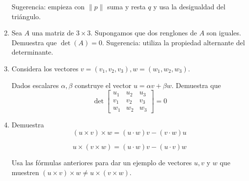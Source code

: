 \documentclass{article}
\theoremstyle{definition}
\begin{document}
\begin{enumerate}
                Sugerencia: empieza con $\|p\|$ suma  y resta $q$ y usa la desigualdad del tri\'angulo.	

\item\label{Ejer:DeterRenglonesRepetidos} Sea $A$ una matriz de $3 \times 3$. Supongamos que dos renglones de $A$ son iguales. Demuestra
que $\det(A)=0$. Sugerencia: utiliza la propiedad alternante del determinante.

\item Considera los vectores $v=(v_1,v_2,v_3), w=(w_1,w_2,w_3)$. 

Dados escalares $\alpha, \beta$ construye
el vector $u=\alpha v+ \beta w$. Demuestra que 
$$
\det\left[
\begin{array}{ccc}
u_1 & u_2 & u_3 \\
v_1 & v_2 & v_3 \\
w_1 & w_2 & w_3
\end{array}
\right]=0
$$


\item Demuestra 
	$$
	(u\times v) \times w= (u \cdot w) v - (v \cdot w ) u
	$$
	
	$$
	u\times (v\times w)=   (u \cdot w )v -(u \cdot v ) w	
	$$

	Usa las f\'ormulas anteriores para dar un ejemplo de vectores $u,v$ y $w$ que muestren 
	$(u\times v) \times w\ne u \times (v \times w) $.
	
	\end{enumerate}





  
       
\end{document}
